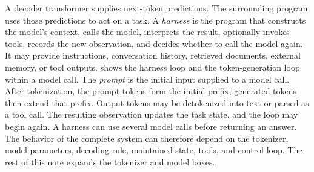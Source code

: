 \documentclass[11pt,twoside]{article}
\theoremstyle{plain}
\theoremstyle{definition}
\theoremstyle{remark}
\begin{document}
A decoder transformer supplies next-token predictions. The surrounding
program uses those predictions to act on a task. A \emph{harness} is the
program that constructs the model's context,
calls the model, interprets the result, optionally invokes tools, records the
new observation, and decides whether to call the model again. It may provide
instructions, conversation history, retrieved documents, external memory, or
tool outputs.  shows the harness loop and the
token-generation loop within a model call.
The \emph{prompt} is the initial input supplied to a model call. After
tokenization, the prompt tokens form the initial prefix; generated tokens then
extend that prefix.
Output tokens may be detokenized into text or parsed as a tool call. The
resulting observation updates the task state, and the loop may begin again. A
harness can use several model calls before returning an answer. The behavior
of the complete system can therefore depend on the tokenizer, model
parameters, decoding rule, maintained state, tools, and control loop. The rest
of this note expands the tokenizer and model boxes.
\end{document}
